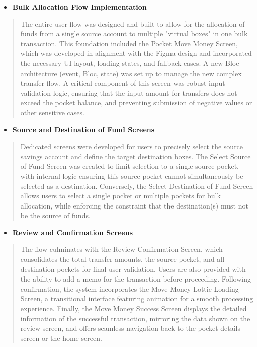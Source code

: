 \documentclass[12pt,oneside,openright,a4paper]{cpe-english-project}
\begin{document}
\begin{itemize}
\item
  \textbf{Bulk Allocation Flow Implementation}
\end{itemize}

\begin{quote}
The entire user flow was designed and built to allow for the allocation
of funds from a single source account to multiple "virtual boxes" in one
bulk transaction. This foundation included the Pocket Move Money Screen,
which was developed in alignment with the Figma design and incorporated
the necessary UI layout, loading states, and fallback cases. A new Bloc
architecture (event, Bloc, state) was set up to manage the new complex
transfer flow. A critical component of this screen was robust input
validation logic, ensuring that the input amount for transfers does not
exceed the pocket balance, and preventing submission of negative values
or other sensitive cases.
\end{quote}

\begin{itemize}
\item
  \textbf{Source and Destination of Fund Screens}
\end{itemize}

\begin{quote}
Dedicated screens were developed for users to precisely select the
source savings account and define the target destination boxes. The
Select Source of Fund Screen was created to limit selection to a single
source pocket, with internal logic ensuring this source pocket cannot
simultaneously be selected as a destination. Conversely, the Select
Destination of Fund Screen allows users to select a single pocket or
multiple pockets for bulk allocation, while enforcing the constraint
that the destination(s) must not be the source of funds.
\end{quote}

\begin{itemize}
\item
  \textbf{Review and Confirmation Screens}
\end{itemize}

\begin{quote}
The flow culminates with the Review Confirmation Screen, which
consolidates the total transfer amounts, the source pocket, and all
destination pockets for final user validation. Users are also provided
with the ability to add a memo for the transaction before proceeding.
Following confirmation, the system incorporates the Move Money Lottie
Loading Screen, a transitional interface featuring animation for a
smooth processing experience. Finally, the Move Money Success Screen
displays the detailed information of the successful transaction,
mirroring the data shown on the review screen, and offers seamless
navigation back to the pocket details screen or the home screen.
\end{quote}
\end{document}
